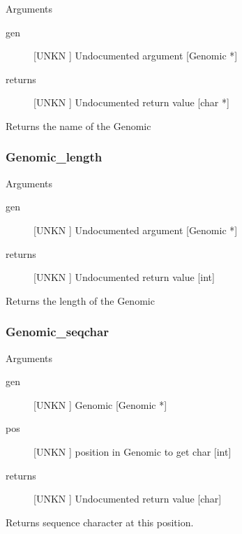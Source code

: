 Arguments
\begin{description}
\item[gen] [UNKN ] Undocumented argument [Genomic *]
\item[returns] [UNKN ] Undocumented return value [char *]
\end{description}
Returns the name of the Genomic


\subsubsection{Genomic_length}

Arguments
\begin{description}
\item[gen] [UNKN ] Undocumented argument [Genomic *]
\item[returns] [UNKN ] Undocumented return value [int]
\end{description}
Returns the length of the Genomic


\subsubsection{Genomic_seqchar}

Arguments
\begin{description}
\item[gen] [UNKN ] Genomic [Genomic *]
\item[pos] [UNKN ] position in Genomic to get char [int]
\item[returns] [UNKN ] Undocumented return value [char]
\end{description}
Returns sequence character at this position.


